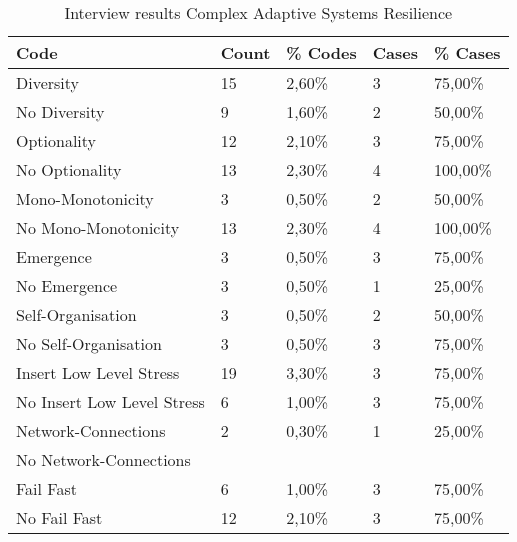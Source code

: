 \begin{table}[htbp]
	\centering
	\begin{tabular}{lllll}
		\toprule
		\textbf{Code} & \textbf{Count} & \textbf{\% Codes} &\textbf{Cases} & \textbf{\% Cases} \\
		\midrule
		Diversity & 15    & 2,60\% & 3     & 75,00\% \\
		No Diversity & 9     & 1,60\% & 2     & 50,00\% \\
		Optionality & 12    & 2,10\% & 3     & 75,00\% \\
		No Optionality & 13    & 2,30\% & 4     & 100,00\% \\
		Mono-Monotonicity & 3     & 0,50\% & 2     & 50,00\% \\
		No Mono-Monotonicity & 13    & 2,30\% & 4     & 100,00\% \\
		Emergence & 3     & 0,50\% & 3     & 75,00\% \\
		No Emergence & 3     & 0,50\% & 1     & 25,00\% \\
		Self-Organisation & 3     & 0,50\% & 2     & 50,00\% \\
		No Self-Organisation & 3     & 0,50\% & 3     & 75,00\% \\
		Insert Low Level Stress & 19    & 3,30\% & 3     & 75,00\% \\
		No Insert Low Level Stress & 6     & 1,00\% & 3     & 75,00\% \\
		Network-Connections & 2     & 0,30\% & 1     & 25,00\% \\
		No Network-Connections &       &       &       &  \\
		Fail Fast & 6     & 1,00\% & 3     & 75,00\% \\
		No Fail Fast & 12    & 2,10\% & 3     & 75,00\% \\
		\bottomrule
	\end{tabular}%
	\caption{Interview results Complex Adaptive Systems Resilience}
	\label{tab:interviewresultscasresilience}%
\end{table}%


